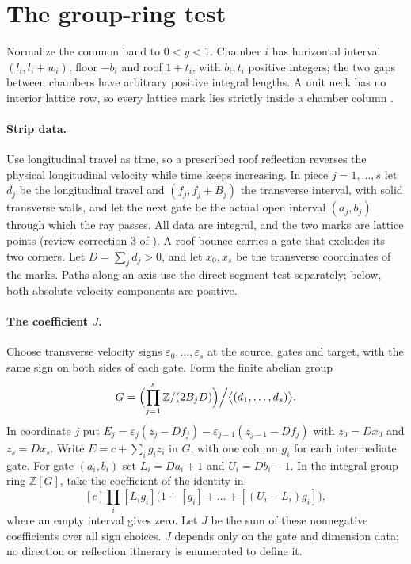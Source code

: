\documentclass[11pt]{article}
\theoremstyle{definition}
\theoremstyle{remark}
\newcommand{\Z}{\mathbb Z}
\begin{document}
\section{The group-ring test}\label{sec:groupring}
Normalize the common band to $0<y<1$. Chamber $i$ has horizontal interval
$(l_i,l_i+w_i)$, floor $-b_i$ and roof $1+t_i$, with $b_i,t_i$ positive integers;
the two gaps between chambers have arbitrary positive integral lengths. A unit
neck has no interior lattice row, so every lattice mark lies strictly inside a
chamber column \cite{R5}.

\paragraph{Strip data.} Use longitudinal travel as time, so a prescribed roof
reflection reverses the physical longitudinal velocity while time keeps
increasing. In piece $j=1,\dots,s$ let $d_j$ be the longitudinal travel and
$(f_j,f_j+B_j)$ the transverse interval, with solid transverse walls, and let the
next gate be the actual open interval $(a_j,b_j)$ through which the ray passes.
All data are integral, and the two marks are lattice points (review correction 3
of \cite{d203}). A roof bounce carries a gate that excludes its two corners. Let
$D=\sum_j d_j>0$, and let $x_0,x_s$ be the transverse coordinates of the marks.
Paths along an axis use the direct segment test separately; below, both absolute
velocity components are positive.

\paragraph{The coefficient $J$.} Choose transverse velocity signs
$\varepsilon_0,\dots,\varepsilon_s$ at the source, gates and target, with the
same sign on both sides of each gate. Form the finite abelian group
\[
G=\Bigl(\prod_{j=1}^{s}\Z/(2B_jD)\Bigr)\Big/\bigl\langle(d_1,\dots,d_s)\bigr\rangle.
\]
In coordinate $j$ put
$E_j=\varepsilon_j(z_j-Df_j)-\varepsilon_{j-1}(z_{j-1}-Df_j)$ with $z_0=Dx_0$
and $z_s=Dx_s$. Write $E=c+\sum_i g_iz_i$ in $G$, with one column $g_i$ for each
intermediate gate. For gate $(a_i,b_i)$ set $L_i=Da_i+1$ and $U_i=Db_i-1$. In the
integral group ring $\Z[G]$, take the coefficient of the identity in
\[
[c]\prod_i[L_ig_i]\bigl(1+[g_i]+\dots+[(U_i-L_i)g_i]\bigr),
\]
where an empty interval gives zero. Let $J$ be the sum of these nonnegative
coefficients over all sign choices. $J$ depends only on the gate and dimension
data; no direction or reflection itinerary is enumerated to define it.
\end{document}

